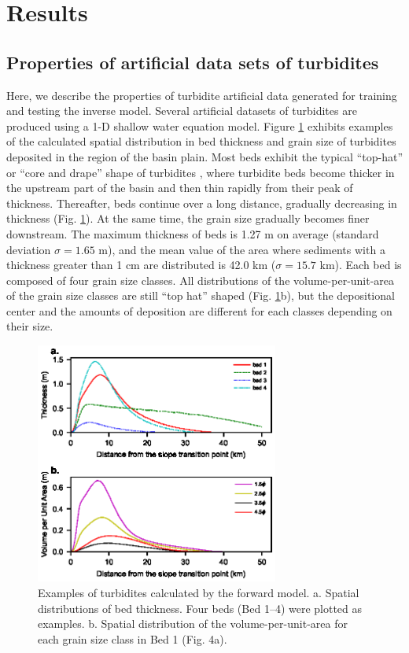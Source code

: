 
\section{Results}

\subsection{Properties of artificial data sets of turbidites}
Here, we describe the properties of turbidite artificial data generated for training and testing the inverse model. Several artificial datasets of turbidites are produced using a 1-D shallow water equation model. Figure \ref{fig:training_examples_artificial_turbidites} exhibits examples of the calculated spatial distribution in bed thickness and grain size of turbidites deposited in the region of the basin plain. Most beds exhibit the typical ``top-hat'' or ``core and drape'' shape of turbidites \cite{Hirayama1977,Talling2012,Pantopoulos2013}, where turbidite beds become thicker in the upstream part of the basin and then thin rapidly from their peak of thickness. Thereafter, beds continue over a long distance, gradually decreasing in thickness (Fig. \ref{fig:training_examples_artificial_turbidites}). At the same time, the grain size gradually becomes finer downstream. The maximum thickness of beds is 1.27 m on average (standard deviation $\sigma = 1.65$ m), and the mean value of the area where sediments with a thickness greater than 1 cm are distributed is 42.0 km ($\sigma=15.7$ km). Each bed is composed of four grain size classes. All distributions of the volume-per-unit-area of the grain size classes are still ``top hat'' shaped (Fig. \ref{fig:training_examples_artificial_turbidites}b), but the depositional center and the amounts of deposition are different for each classes depending on their size.

\begin{figure}[t]
  \includegraphics[width=8cm]{fig04.eps}
  \caption{Examples of turbidites calculated by the forward model. \textsf{a}. Spatial distributions of bed thickness. Four beds (Bed 1--4) were plotted as examples. \textsf{b}. Spatial distribution of the volume-per-unit-area for each grain size class in Bed 1 (Fig. 4a).}
  \label{fig:training_examples_artificial_turbidites}
\end{figure}

